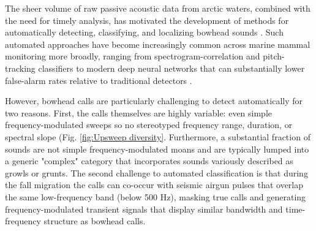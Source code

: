 \documentclass[preprint,NumberedRefs]{JASAnew}
\begin{document}



The sheer volume of raw passive acoustic data from arctic waters, combined with the
need for timely analysis, has motivated the development of methods for automatically
detecting, classifying, and localizing bowhead sounds \cite{thode2012automated}. Such automated approaches have become increasingly
common across marine mammal monitoring more broadly, ranging from spectrogram-correlation
and pitch-tracking classifiers \cite{mellinger2000bowhead, baumgartner2011generalized}
to modern deep neural networks that can substantially lower false-alarm rates relative
to traditional detectors \cite{shiu2020deep, allen2021convolutional}.

However, bowhead calls are particularly challenging to detect automatically
for two reasons. First, the calls themselves are highly variable: even simple frequency-modulated sweeps so no stereotyped frequency range, duration, or spectral slope (Fig. \ref{fig:Upsweep diversity}. Furthermore, a substantial fraction of sounds are not simple frequency-modulated moans and are typically lumped into a generic "complex" category
\cite{clark1984sounds, stafford2021acoustic} that incorporates sounds variously described as growls or grunts. The second challenge to automated classification is that during the fall migration the calls
can co-occur with seismic airgun pulses that overlap the same low-frequency band
(below 500 Hz), masking true calls and generating frequency-modulated transient signals that display similar bandwidth and time-frequency structure as bowhead calls\cite{blackwell2015effects, thode2012automated}.
\end{document}
